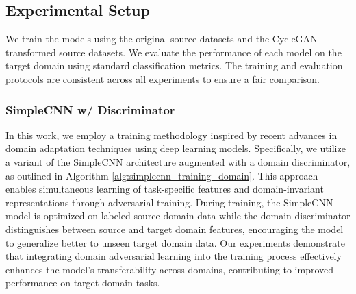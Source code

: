 \documentclass[conference]{IEEEtran}
\begin{document}
\subsection{Experimental Setup}
We train the models using the original source datasets and the CycleGAN-transformed source datasets. We evaluate the performance of each model on the target domain using standard classification metrics. The training and evaluation protocols are consistent across all experiments to ensure a fair comparison.

\subsubsection{SimpleCNN w/ Discriminator}

In this work, we employ a training methodology inspired by recent advances in domain adaptation techniques using deep learning models. Specifically, we utilize a variant of the SimpleCNN architecture augmented with a domain discriminator, as outlined in Algorithm \ref{alg:simplecnn_training_domain}. This approach enables simultaneous learning of task-specific features and domain-invariant representations through adversarial training. During training, the SimpleCNN model is optimized on labeled source domain data while the domain discriminator distinguishes between source and target domain features, encouraging the model to generalize better to unseen target domain data. Our experiments demonstrate that integrating domain adversarial learning into the training process effectively enhances the model's transferability across domains, contributing to improved performance on target domain tasks.
\end{document}
